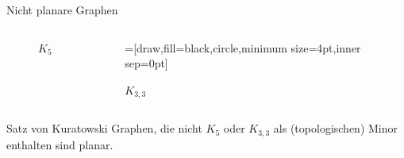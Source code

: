 \documentclass[18pt]{beamer}
\begin{document}
    \begin{frame}{Nicht planare Graphen}
        \begin{columns}
            \begin{column}{0.5\textwidth}    
            \begin{figure}
                \centering
                \newcommand\n{5}
                \caption{$K_5$}
            \end{figure}
            \end{column}

            \begin{column}{0.5\textwidth}
                
            
            \begin{figure}[]
                \centering
                =[draw,fill=black,circle,minimum size=4pt,inner sep=0pt]

                \caption{$K_{3,3}$}
            \end{figure}
        \end{column}    
    \end{columns}

    \pause
    \begin{block}{Satz von Kuratowski}
        Graphen, die nicht $K_5$ oder $K_{3,3}$ als
        (topologischen) Minor enthalten sind planar.
    \end{block}
    \end{frame}
\end{document}
